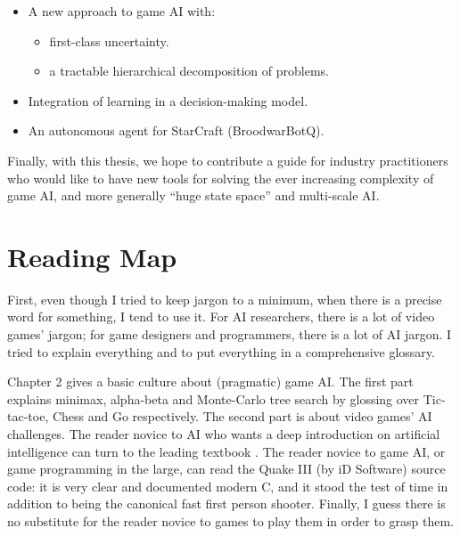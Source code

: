 \begin{itemize}
\item A new approach to game AI with:
\begin{itemize}
\item first-class uncertainty.
\item a tractable hierarchical decomposition of problems.
\end{itemize}
\item Integration of learning in a decision-making model. 
\item An autonomous agent for StarCraft (BroodwarBotQ).
\end{itemize}

Finally, with this thesis, we hope to contribute a guide for industry practitioners who would like to have new tools for solving the ever increasing complexity of game AI, and more generally ``huge state space'' and multi-scale AI.




\section{Reading Map}
First, even though I tried to keep jargon to a minimum, when there is a precise word for something, I tend to use it. For AI researchers, there is a lot of video games' jargon; for game designers and programmers, there is a lot of AI jargon. I tried to explain everything and to put everything in a comprehensive glossary.

Chapter 2 gives a basic culture about (pragmatic) game AI. The first part explains minimax, alpha-beta and Monte-Carlo tree search by glossing over Tic-tac-toe, Chess and Go respectively. The second part is about video games' AI challenges. The reader novice to AI who wants a deep introduction on artificial intelligence can turn to the leading textbook \citep{AIMA}. The reader novice to game AI, or game programming in the large, can read the Quake III (by iD Software) source code: it is very clear and documented modern C, and it stood the test of time in addition to being the canonical fast first person shooter. Finally, I guess there is no substitute for the reader novice to games to play them in order to grasp them.

